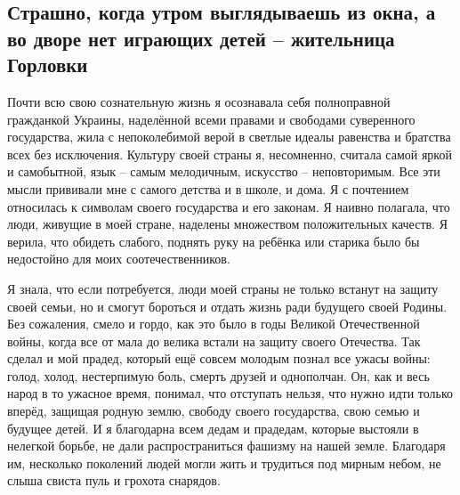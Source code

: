  
 
 
 
 
\subsection{Страшно, когда утром выглядываешь из окна, а во дворе нет играющих детей – жительница Горловки}
\label{sec:01_12_2021.stz.news.ru.donbasstoday.1.pismo_gorlovka_vojna}


Почти всю свою сознательную жизнь я осознавала себя полноправной гражданкой
Украины, наделённой всеми правами и свободами суверенного государства, жила с
непоколебимой верой в светлые идеалы равенства и братства всех без исключения.
Культуру своей страны я, несомненно, считала самой яркой и самобытной, язык –
самым мелодичным, искусство – неповторимым. Все эти мысли прививали мне с
самого детства и в школе, и дома. Я с почтением относилась к символам своего
государства и его законам. Я наивно полагала, что люди, живущие в моей стране,
наделены множеством положительных качеств. Я верила, что обидеть слабого,
поднять руку на ребёнка или старика было бы недостойно для моих
соотечественников.

Я знала, что если потребуется, люди моей страны не только встанут на защиту
своей семьи, но и смогут бороться и отдать жизнь ради будущего своей Родины.
Без сожаления, смело и гордо, как это было в годы Великой Отечественной войны,
когда все от мала до велика встали на защиту своего Отечества. Так сделал и мой
прадед, который ещё совсем молодым познал все ужасы войны: голод, холод,
нестерпимую боль, смерть друзей и однополчан. Он, как и весь народ в то ужасное
время, понимал, что отступать нельзя, что нужно идти только вперёд, защищая
родную землю, свободу своего государства, свою семью и будущее детей. И я
благодарна всем дедам и прадедам, которые выстояли в нелегкой борьбе, не дали
распространиться фашизму на нашей земле. Благодаря им, несколько поколений
людей могли жить и трудиться под мирным небом, не слыша свиста пуль и грохота
снарядов.

